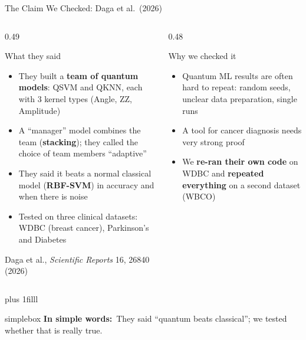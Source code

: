 \documentclass[aspectratio=169,11pt,t,xcolor={table}]{beamer}
\newcommand{\insimple}[1]{%
  \par\vskip 0pt plus 1filll
  \begin{beamercolorbox}[wd=\textwidth,sep=4pt,rounded=true]{simplebox}%
    \small\textbf{\textcolor{qamber!75!black}{In simple words:}}\ #1%
  \end{beamercolorbox}\vskip1pt}
\newcommand{\secquestion}{}
\begin{document}
\begin{frame}{The Claim We Checked: Daga et al.\ (2026)}
  \begin{columns}[T,onlytextwidth]
    \begin{column}{0.49\textwidth}
      \begin{block}{What they said}
        \footnotesize
        \begin{itemize}
          \item They built a \textbf{team of quantum models}: QSVM and QKNN, each with 3 kernel types (Angle, ZZ, Amplitude)
          \item A ``manager'' model combines the team (\textbf{stacking}); they called the choice of team members ``adaptive''
          \item They said it beats a normal classical model (\textbf{RBF-SVM}) in accuracy and when there is noise
          \item Tested on three clinical datasets: WDBC (breast cancer), Parkinson's and Diabetes
        \end{itemize}
      \end{block}
      {\scriptsize\color{qgray} Daga et al., \textit{Scientific Reports} 16, 26840 (2026)}
    \end{column}
    \begin{column}{0.48\textwidth}
      \begin{alertblock}{Why we checked it}
        \footnotesize
        \begin{itemize}
          \item Quantum ML results are often hard to repeat: random seeds, unclear data preparation, single runs
          \item A tool for cancer diagnosis needs very strong proof
          \item We \textbf{re-ran their own code} on WDBC and \textbf{repeated everything} on a second dataset (WBCO)
        \end{itemize}
      \end{alertblock}
    \end{column}
  \end{columns}
  \insimple{They said ``quantum beats classical''; we tested whether that is really true.}
\end{frame}

\renewcommand{\secquestion}{What do we already know?}
\end{document}

